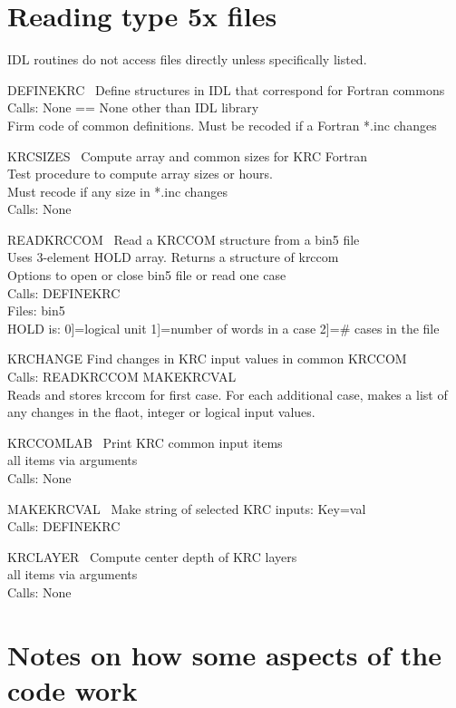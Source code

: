 \documentclass[draft]{article}  %
\begin{document}
\section{Reading type 5x files} %

IDL routines do not access files directly unless specifically listed.

DEFINEKRC \ Define structures in IDL that correspond for Fortran commons \\
Calls: None == None other than IDL library \\
Firm code of common definitions. Must be recoded if a Fortran *.inc changes

KRCSIZES \ Compute array and common sizes for KRC Fortran \\
Test procedure to compute array sizes or hours. \\
Must recode if any size in *.inc changes \\
Calls: None

READKRCCOM \ Read a KRCCOM structure from a bin5 file \\
Uses 3-element HOLD array. Returns a structure of krccom \\
Options to open or close bin5 file or read one case  \\
Calls: DEFINEKRC \\
Files: bin5 \\
HOLD is: 0]=logical unit  1]=number of words in a case  2]=\# cases in the file 

KRCHANGE   Find changes in KRC input values in common KRCCOM \\
Calls:  READKRCCOM  MAKEKRCVAL \\
Reads and stores krccom for first case. For each additional case, makes a 
list of any changes in the flaot, integer or logical input values. 

KRCCOMLAB \ Print KRC common input items \\
 all items via arguments \\
Calls: None

MAKEKRCVAL \ Make string of selected KRC inputs: Key=val \\
Calls: DEFINEKRC

KRCLAYER \ Compute center depth of KRC layers \\
 all items via arguments \\
Calls: None

\section{Notes on how some aspects of the code work} %
\end{document}
